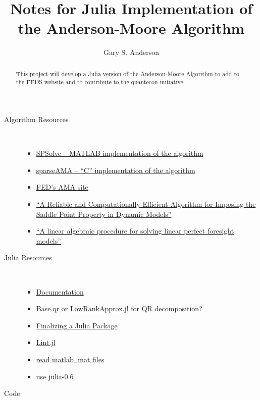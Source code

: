 \documentclass[12pt]{article}
\title{Notes for Julia Implementation of the Anderson-Moore Algorithm}
\author{Gary S. Anderson}
\begin{document}
\maketitle
\begin{abstract}
  This project will develop a Julia version of the Anderson-Moore Algorithm to add to the \href{https://www.federalreserve.gov/econres/ama-index.htm}{FEDS website}  and to contribute to the \href{http://quantecon.org/quantecon.jl}{quantecon initiative.}  
\end{abstract}
\begin{description}
\item[Algorithm Resources] \ 
\begin{itemize}
\item \href{https://github.com/es335mathwiz/SPSolve.git}{SPSolve -- MATLAB implementation of the algorithm}
\item \href{https://github.com/es335mathwiz/sparseAMA.git}{sparseAMA -- ``C'' implementation of the algorithm}
\item \href{https://www.federalreserve.gov/econres/ama-index.htm}{FED's AMA site}
\item \href{https://www.sciencedirect.com/science/article/pii/S1474667017405064}{``A Reliable and Computationally Efficient Algorithm for Imposing the Saddle Point Property in Dynamic Models''}
\item \href{https://www.sciencedirect.com/science/article/pii/0165176585902113}{``A linear algebraic procedure for solving linear perfect foresight models''}
\end{itemize}
\item[Julia Resources] \
  \begin{itemize}
  \item \href{https://docs.julialang.org/en/stable/}{Documentation}
  \item Base.qr or \href{https://github.com/JuliaMatrices/LowRankApprox.jl}{LowRankApprox.jl} for QR decomposition?
  \item \href{http://www.stochasticlifestyle.com/finalizing-julia-package-documentation-testing-coverage-publishing/}{Finalizing a Julia Package}
  \item \href{https://www.google.com/url?sa=t&rct=j&q=&esrc=s&source=web&cd=4&cad=rja&uact=8&ved=0ahUKEwjh_vH_h-DaAhUExYMKHYb7BWoQFgg5MAM&url=https%3A%2F%2Fgithub.com%2Ftonyhffong%2FLint.jl%2Fblob%2Fmaster%2Fdocs%2Ffeatures.md&usg=AOvVaw1FFQ9J64mhTjDx8QpQ-_zU}{Lint.jl}
 \item \href{https://github.com/JuliaIO/MAT.jl}{read matlab .mat files}
 \item use  julia-0.6
  \end{itemize}
\newpage
\item[Code] \
  

\end{description}
\end{document}
